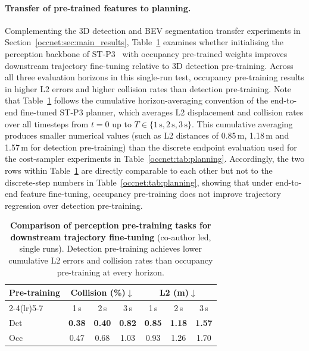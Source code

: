 \paragraph{Transfer of pre-trained features to planning.} Complementing the 3D detection and BEV segmentation transfer experiments in Section~\ref{occnet:sec:main_results}, Table~\ref{occnet:tab:planning_pretrain} examines whether initialising the perception backbone of ST-P3~\cite{hu2022stp3} with occupancy pre-trained weights improves downstream trajectory fine-tuning relative to 3D detection pre-training. Across all three evaluation horizons in this single-run test, occupancy pre-training results in higher L2 errors and higher collision rates than detection pre-training. Note that Table~\ref{occnet:tab:planning_pretrain} follows the cumulative horizon-averaging convention of the end-to-end fine-tuned ST-P3 planner, which averages L2 displacement and collision rates over all timesteps from $t=0$ up to $T\in\{1\,\text{s},2\,\text{s},3\,\text{s}\}$. This cumulative averaging produces smaller numerical values (such as L2 distances of 0.85\,m, 1.18\,m and 1.57\,m for detection pre-training) than the discrete endpoint evaluation used for the cost-sampler experiments in Table~\ref{occnet:tab:planning}. Accordingly, the two rows within Table~\ref{occnet:tab:planning_pretrain} are directly comparable to each other but not to the discrete-step numbers in Table~\ref{occnet:tab:planning}, showing that under end-to-end feature fine-tuning, occupancy pre-training does not improve trajectory regression over detection pre-training.

\begin{table}[t]
  \centering
  \caption[Comparison of perception pre-training for trajectory planning]{\textbf{Comparison of perception pre-training tasks for downstream trajectory fine-tuning} (co-author led, single runs). Detection pre-training achieves lower cumulative L2 errors and collision rates than occupancy pre-training at every horizon.}
  \label{occnet:tab:planning_pretrain}
  \begin{tabular}{lcccccc}
    \toprule
    \multirow{2}{*}{Pre-training} & \multicolumn{3}{c}{Collision (\%)$\downarrow$} & \multicolumn{3}{c}{L2 (m)$\downarrow$} \\
    \cmidrule(lr){2-4}\cmidrule(lr){5-7}
     & 1\,s & 2\,s & 3\,s & 1\,s & 2\,s & 3\,s \\
    \midrule
    Det & \textbf{0.38} & \textbf{0.40} & \textbf{0.82} & \textbf{0.85} & \textbf{1.18} & \textbf{1.57} \\
    Occ & 0.47 & 0.68 & 1.03 & 0.93 & 1.26 & 1.70 \\
    \bottomrule
  \end{tabular}
\end{table}


